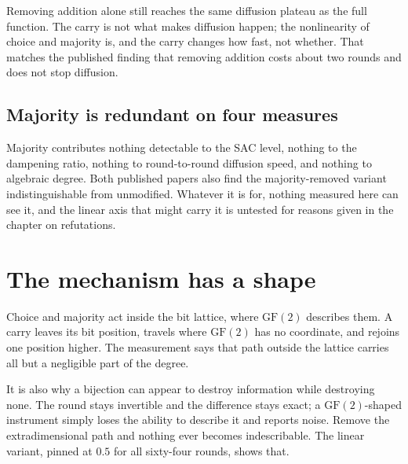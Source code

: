 Removing addition alone still reaches the same diffusion plateau as the full function. The carry is not what makes diffusion happen; the nonlinearity of choice and majority is, and the carry changes how fast, not whether. That matches the published finding that removing addition costs about two rounds and does not stop diffusion.

\subsection{Majority is redundant on four measures}

Majority contributes nothing detectable to the SAC level, nothing to the dampening ratio, nothing to round-to-round diffusion speed, and nothing to algebraic degree. Both published papers also find the majority-removed variant indistinguishable from unmodified. Whatever it is for, nothing measured here can see it, and the linear axis that might carry it is untested for reasons given in the chapter on refutations.

\section{The mechanism has a shape}

Choice and majority act inside the bit lattice, where \(\mathrm{GF}(2)\) describes them. A carry leaves its bit position, travels where \(\mathrm{GF}(2)\) has no coordinate, and rejoins one position higher. The measurement says that path outside the lattice carries all but a negligible part of the degree.

It is also why a bijection can appear to destroy information while destroying none. The round stays invertible and the difference stays exact; a \(\mathrm{GF}(2)\)-shaped instrument simply loses the ability to describe it and reports noise. Remove the extradimensional path and nothing ever becomes indescribable. The linear variant, pinned at \(0.5\) for all sixty-four rounds, shows that.
